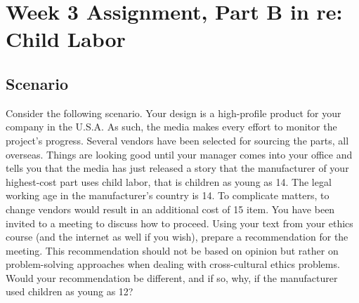 \chapter{Week 3 Assignment, Part B in re: Child Labor}
\label{ch:child-labor}
\section*{Scenario}
Consider the following scenario.
Your design is a high-profile product for your company in the U.S.A. As such, the media
makes every effort to monitor the project's progress. Several vendors have been
selected for sourcing the parts, all overseas. Things are looking good until your
manager comes into your office and tells you that the media has just released a story
that the manufacturer of your highest-cost part uses child labor, that is children as
young as 14. The legal working age in the manufacturer's country is 14. To complicate
matters, to change vendors would result in an additional cost of 15%
item. You have been invited to a meeting to discuss how to proceed. Using your text
from your ethics course (and the internet as well if you wish), prepare a
recommendation for the meeting. This recommendation should not be based on opinion
but rather on problem-solving approaches when dealing with cross-cultural ethics
problems. Would your recommendation be different, and if so, why, if the manufacturer
used children as young as 12?


